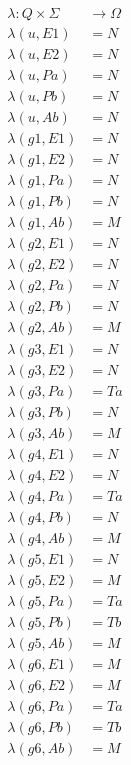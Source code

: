 \documentclass[12pt,a4paperx]{report}
\begin{document}
	\begin{align*}
		\lambda : Q \times \Sigma &\to \Omega \\
		\lambda(u,E1) &= N \\
		\lambda(u,E2) &= N \\
		\lambda(u,Pa) &= N \\
		\lambda(u,Pb) &= N \\
		\lambda(u,Ab) &= N \\
		\lambda(g1, E1) &= N \\
		\lambda(g1, E2) &= N \\
		\lambda(g1, Pa) &= N \\
		\lambda(g1, Pb) &= N \\
		\lambda(g1, Ab) &= M \\
		\lambda(g2, E1) &= N \\
		\lambda(g2, E2) &= N \\
		\lambda(g2, Pa) &= N \\
		\lambda(g2, Pb) &= N \\
		\lambda(g2, Ab) &= M \\
		\lambda(g3, E1) &= N \\
		\lambda(g3, E2) &= N \\
		\lambda(g3, Pa) &= Ta \\
		\lambda(g3, Pb) &= N \\
		\lambda(g3, Ab) &= M \\
		\lambda(g4, E1) &= N \\
		\lambda(g4, E2) &= N \\
		\lambda(g4, Pa) &= Ta \\
		\lambda(g4, Pb) &= N \\
		\lambda(g4, Ab) &= M \\
		\lambda(g5, E1) &= N \\
		\lambda(g5, E2) &= M \\
		\lambda(g5, Pa) &= Ta \\
		\lambda(g5, Pb) &= Tb \\
		\lambda(g5, Ab) &= M \\
		\lambda(g6, E1) &= M \\
		\lambda(g6, E2) &= M \\
		\lambda(g6, Pa) &= Ta \\
		\lambda(g6, Pb) &= Tb \\
		\lambda(g6, Ab) &= M
	\end{align*}
\end{document}
